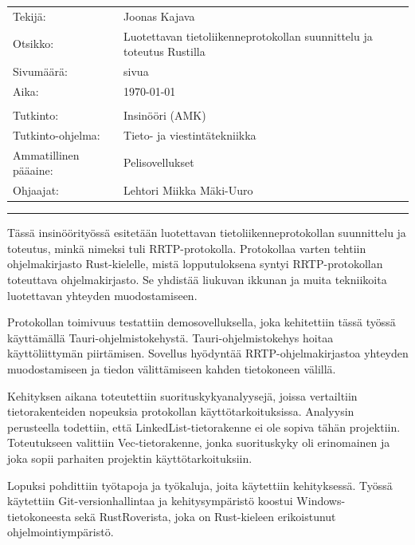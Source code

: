 \documentclass[a4paper,12pt]{article}
\renewcommand{\title}{Luotettavan tietoliikenneprotokollan \newline suunnittelu ja toteutus Rustilla}
\newcommand{\me}{Joonas Kajava}
\newcommand{\pageCount}{ \pageref{LastPage}}
\newcommand*\sepline{
    \begin{center}
        \rule[1ex]{\textwidth}{.5pt}
    \end{center}}
\begin{document}
\begin{titlepage}
\setlength{\tabcolsep}{0cm}
        \begin{tabular} {p{5cm} p{10cm}}
            Tekijä:               & \me                                            \\
            Otsikko:              & \title                                         \\
            Sivumäärä:            & \pageCount{} sivua                             \\
            Aika:                 & \today                                         \\
            \\
            Tutkinto: & Insinööri (AMK) \\
            Tutkinto-ohjelma: & Tieto- ja viestintätekniikka \\
            Ammatillinen pääaine: & Pelisovellukset \\
            Ohjaajat: & Lehtori Miikka Mäki-Uuro\\
        \end{tabular}
        \sepline
        \begin{singlespace}
        
        Tässä insinöörityössä esitetään luotettavan tietoliikenneprotokollan suunnittelu ja toteutus, minkä nimeksi tuli RRTP-protokolla. Protokollaa varten tehtiin ohjelmakirjasto Rust-kielelle, mistä lopputuloksena syntyi RRTP-protokollan toteuttava ohjelmakirjasto. Se yhdistää liukuvan ikkunan ja muita tekniikoita luotettavan yhteyden muodostamiseen. \par

        Protokollan toimivuus testattiin demosovelluksella, joka kehitettiin tässä työssä käyttämällä Tauri-ohjelmistokehystä. Tauri-ohjelmistokehys hoitaa käyttöliittymän piirtämisen. Sovellus hyödyntää RRTP-ohjelmakirjastoa yhteyden muodostamiseen ja tiedon välittämiseen kahden tietokoneen välillä. \par

        Kehityksen aikana toteutettiin suorituskykyanalyysejä, joissa vertailtiin tietorakenteiden nopeuksia protokollan käyttötarkoituksissa. Analyysin perusteella todettiin, että LinkedList-tietorakenne ei ole sopiva tähän projektiin. Toteutukseen valittiin Vec-tietorakenne, jonka suorituskyky oli erinomainen ja joka sopii parhaiten projektin käyttötarkoituksiin.\par

        Lopuksi pohdittiin työtapoja ja työkaluja, joita käytettiin kehityksessä. Työssä käytettiin Git-versionhallintaa ja kehitysympäristö koostui Windows-tietokoneesta sekä RustRoverista, joka on Rust-kieleen erikoistunut ohjelmointiympäristö. 
        

\end{singlespace}
\end{titlepage}
\end{document}
